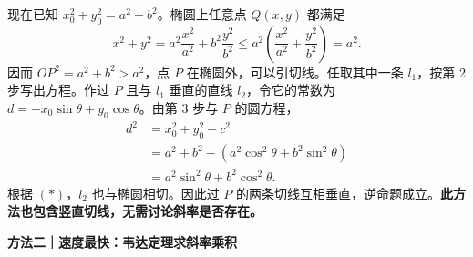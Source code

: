\begin{proofbox}
\begin{description}[style=nextline, leftmargin=2.8em, labelsep=0.5em, itemsep=0.48em]
      现在已知 $x_0^2+y_0^2=a^2+b^2$。椭圆上任意点 $Q(x,y)$ 都满足
      \[
        x^2+y^2=a^2\frac{x^2}{a^2}+b^2\frac{y^2}{b^2}
        \le a^2\left(\frac{x^2}{a^2}+\frac{y^2}{b^2}\right)=a^2.
      \]
      因而 $OP^2=a^2+b^2>a^2$，点 $P$ 在椭圆外，可以引切线。任取其中一条 $l_1$，按第 2 步写出方程。作过 $P$ 且与 $l_1$ 垂直的直线 $l_2$，令它的常数为 $d=-x_0\sin\theta+y_0\cos\theta$。由第 3 步与 $P$ 的圆方程，
      \[
      \begin{aligned}
        d^2&=x_0^2+y_0^2-c^2\\
           &=a^2+b^2-(a^2\cos^2\theta+b^2\sin^2\theta)\\
           &=a^2\sin^2\theta+b^2\cos^2\theta.
      \end{aligned}
      \]
      根据 $(*)$，$l_2$ 也与椭圆相切。因此过 $P$ 的两条切线互相垂直，逆命题成立。\textbf{此方法也包含竖直切线，无需讨论斜率是否存在。}
  \end{description}

  \medskip
  \begin{minipage}{\linewidth}
  \textbf{\textcolor{CProof}{方法二｜速度最快：韦达定理求斜率乘积}}


\end{minipage}
\end{proofbox}
